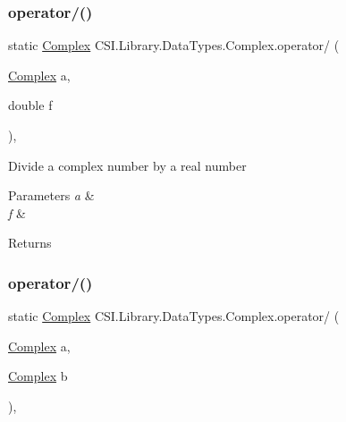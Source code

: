 \subsubsection{\texorpdfstring{operator/()}{operator/()}\hspace{0.1cm}{\footnotesize\ttfamily [1/2]}}
{\footnotesize\ttfamily static \mbox{\hyperlink{struct_c_s_i_1_1_library_1_1_data_types_1_1_complex}{Complex}} C\+S\+I.\+Library.\+Data\+Types.\+Complex.\+operator/ (\begin{DoxyParamCaption}\item[{\mbox{\hyperlink{struct_c_s_i_1_1_library_1_1_data_types_1_1_complex}{Complex}}}]{a,  }\item[{double}]{f }\end{DoxyParamCaption})\hspace{0.3cm}{\ttfamily [inline]}, {\ttfamily [static]}}



Divide a complex number by a real number 


\begin{DoxyParams}{Parameters}
{\em a} & \\
\hline
{\em f} & \\
\hline
\end{DoxyParams}
\begin{DoxyReturn}{Returns}

\end{DoxyReturn}
\mbox{\label{struct_c_s_i_1_1_library_1_1_data_types_1_1_complex_abd480458280f02b41fc4baa0bc8a5f53}} 
\subsubsection{\texorpdfstring{operator/()}{operator/()}\hspace{0.1cm}{\footnotesize\ttfamily [2/2]}}
{\footnotesize\ttfamily static \mbox{\hyperlink{struct_c_s_i_1_1_library_1_1_data_types_1_1_complex}{Complex}} C\+S\+I.\+Library.\+Data\+Types.\+Complex.\+operator/ (\begin{DoxyParamCaption}\item[{\mbox{\hyperlink{struct_c_s_i_1_1_library_1_1_data_types_1_1_complex}{Complex}}}]{a,  }\item[{\mbox{\hyperlink{struct_c_s_i_1_1_library_1_1_data_types_1_1_complex}{Complex}}}]{b }\end{DoxyParamCaption})\hspace{0.3cm}{\ttfamily [inline]}, {\ttfamily [static]}}




